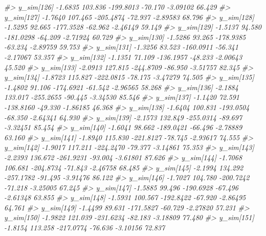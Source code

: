 \documentclass[
  10pt,
  italian,
  a4paper,
  extrafontsizes,onecolumn,openright
  ]{memoir}
\newenvironment{Shaded}{\begin{snugshade}}{\end{snugshade}}
\newcommand{\CommentTok}[1]{\textcolor[rgb]{0.56,0.35,0.01}{\textit{#1}}}
\begin{document}
\begin{Shaded}
\begin{Highlighting}[]
\CommentTok{\#\textgreater{}   y\_sim[126] {-}1.6835 103.836 {-}199.8013 {-}70.170 {-}3.09102 66.429}
\CommentTok{\#\textgreater{}   y\_sim[127] {-}1.7640 107.465 {-}205.4874 {-}72.937 {-}2.89583 68.796}
\CommentTok{\#\textgreater{}   y\_sim[128] {-}1.5295  92.665 {-}177.3528 {-}62.962 {-}2.46149 59.149}
\CommentTok{\#\textgreater{}   y\_sim[129] {-}1.5137  94.580 {-}181.0298 {-}64.209 {-}2.71924 60.729}
\CommentTok{\#\textgreater{}   y\_sim[130] {-}1.5286  93.265 {-}178.9385 {-}63.234 {-}2.89759 59.753}
\CommentTok{\#\textgreater{}   y\_sim[131] {-}1.3256  83.523 {-}160.0911 {-}56.341 {-}2.17067 53.357}
\CommentTok{\#\textgreater{}   y\_sim[132] {-}1.1351  71.109 {-}136.1957 {-}48.233 {-}2.00643 45.520}
\CommentTok{\#\textgreater{}   y\_sim[133] {-}2.0913 127.815 {-}244.8709 {-}86.950 {-}3.51757 82.345}
\CommentTok{\#\textgreater{}   y\_sim[134] {-}1.8723 115.827 {-}222.0815 {-}78.175 {-}3.47279 74.505}
\CommentTok{\#\textgreater{}   y\_sim[135] {-}1.4802  91.106 {-}174.6921 {-}61.542 {-}2.96565 58.268}
\CommentTok{\#\textgreater{}   y\_sim[136] {-}2.1884 133.017 {-}255.2655 {-}90.445 {-}3.34530 85.546}
\CommentTok{\#\textgreater{}   y\_sim[137] {-}1.1420  72.591 {-}138.8160 {-}49.330 {-}1.86185 46.368}
\CommentTok{\#\textgreater{}   y\_sim[138] {-}1.6404 100.831 {-}193.0504 {-}68.350 {-}2.64341 64.930}
\CommentTok{\#\textgreater{}   y\_sim[139] {-}2.1573 132.849 {-}255.0314 {-}89.697 {-}3.32451 85.454}
\CommentTok{\#\textgreater{}   y\_sim[140] {-}1.6041  98.662 {-}189.0421 {-}66.496 {-}2.78889 63.160}
\CommentTok{\#\textgreater{}   y\_sim[141] {-}1.8940 115.830 {-}221.8127 {-}78.745 {-}2.93617 74.555}
\CommentTok{\#\textgreater{}   y\_sim[142] {-}1.9017 117.211 {-}224.2470 {-}79.377 {-}3.14861 75.353}
\CommentTok{\#\textgreater{}   y\_sim[143] {-}2.2393 136.672 {-}261.9231 {-}93.004 {-}3.61801 87.626}
\CommentTok{\#\textgreater{}   y\_sim[144] {-}1.7068 106.681 {-}204.8734 {-}71.843 {-}2.46758 68.485}
\CommentTok{\#\textgreater{}   y\_sim[145] {-}2.1994 134.292 {-}257.1782 {-}91.495 {-}3.91476 86.122}
\CommentTok{\#\textgreater{}   y\_sim[146] {-}1.7027 104.780 {-}200.7242 {-}71.218 {-}3.25005 67.245}
\CommentTok{\#\textgreater{}   y\_sim[147] {-}1.5885  99.496 {-}190.6928 {-}67.496 {-}2.61348 63.855}
\CommentTok{\#\textgreater{}   y\_sim[148] {-}1.5931 100.567 {-}192.8422 {-}67.920 {-}2.86495 64.761}
\CommentTok{\#\textgreater{}   y\_sim[149] {-}1.4499  89.631 {-}171.5827 {-}60.729 {-}2.27820 57.231}
\CommentTok{\#\textgreater{}   y\_sim[150] {-}1.9822 121.039 {-}231.6234 {-}82.183 {-}3.18809 77.480}
\CommentTok{\#\textgreater{}   y\_sim[151] {-}1.8154 113.258 {-}217.0774 {-}76.636 {-}3.10156 72.837}

\end{Highlighting}
\end{Shaded}
\end{document}
